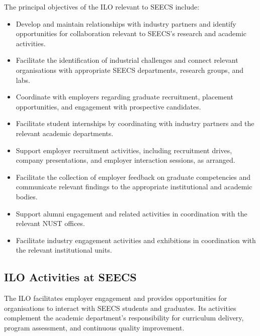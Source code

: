 The principal objectives of the ILO relevant to SEECS include:

\begin{itemize}[noitemsep, topsep=0pt]
    \item Develop and maintain relationships with industry partners
    and identify opportunities for collaboration relevant to
    SEECS's research and academic activities.

    \item Facilitate the identification of industrial challenges
    and connect relevant organisations with appropriate SEECS departments, research groups, and labs.

    \item Coordinate with employers regarding graduate recruitment,
    placement opportunities, and engagement with prospective
    candidates.

    \item Facilitate student internships by coordinating with
    industry partners and the relevant academic departments.

    \item Support employer recruitment activities, including
    recruitment drives, company presentations, and employer
    interaction sessions, as arranged.

    \item Facilitate the collection of employer feedback on
    graduate competencies and communicate relevant findings to
    the appropriate institutional and academic bodies.

    \item Support alumni engagement and related activities in
    coordination with the relevant NUST offices.

    \item Facilitate industry engagement activities and exhibitions
    in coordination with the relevant institutional units.
\end{itemize}

\subsection{ILO Activities at SEECS}

The ILO facilitates employer engagement and provides opportunities
for organisations to interact with SEECS students and graduates.
Its activities complement the academic department's responsibility
for curriculum delivery, program assessment, and continuous
quality improvement.

